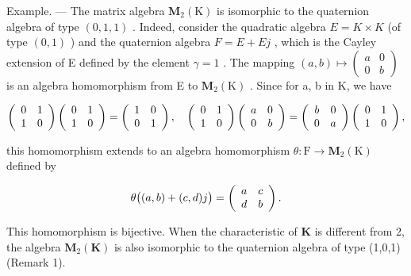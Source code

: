 Example. --- The matrix algebra \(\mathbf{M}_{2}(\mathrm{K})\) is isomorphic to the quaternion algebra of type \((0,1,1)\) . Indeed, consider the quadratic algebra \(E = K \times K\) (of type \((0,1)\) ) and the quaternion algebra \(F = E + Ej\) , which is the Cayley extension of E defined by the element \(\gamma = 1\) . The mapping \((a,b) \mapsto \begin{pmatrix} a & 0 \\ 0 & b \end{pmatrix}\) is an algebra homomorphism from E to \(\mathbf{M}_{2}(\mathrm{K})\) . Since for a, b in K, we have

\[
\left( \begin{array}{c c} 0 & 1 \\ 1 & 0 \end{array} \right) \left( \begin{array}{c c} 0 & 1 \\ 1 & 0 \end{array} \right) = \left( \begin{array}{c c} 1 & 0 \\ 0 & 1 \end{array} \right), \quad \left( \begin{array}{c c} 0 & 1 \\ 1 & 0 \end{array} \right) \left( \begin{array}{c c} a & 0 \\ 0 & b \end{array} \right) = \left( \begin{array}{c c} b & 0 \\ 0 & a \end{array} \right) \left( \begin{array}{c c} 0 & 1 \\ 1 & 0 \end{array} \right),
\]

this homomorphism extends to an algebra homomorphism \(\theta : \mathrm{F} \longrightarrow \mathbf{M}_2(\mathrm{K})\) defined by

\[
\theta \bigl ((a, b) + (c, d) j \bigr) = \left( \begin{array}{c c} a & c \\ d & b \end{array} \right)  .
\]

This homomorphism is bijective. When the characteristic of \(\mathbf{K}\) is different from 2, the algebra \(\mathbf{M}_2(\mathbf{K})\) is also isomorphic to the quaternion algebra of type (1,0,1) (Remark 1).


